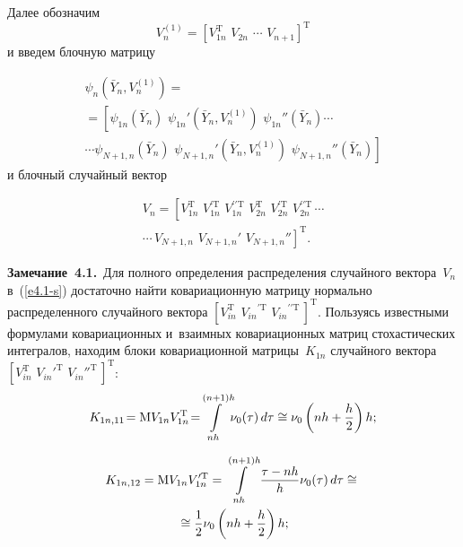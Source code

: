 \begin{multicols}{2}
Далее обозначим
$$
V_n^{(1)}=\left[ V_{1n}^{\mathrm{T}}\,\, V_{2n}\,\,\cdots\,\, V_{n+1}\right]^{\mathrm{T}}
$$
и введем блочную матрицу

\vspace*{-6pt}

\noindent
   \begin{multline*}
   \psi_n\left(\bar Y_n,V_n^{(1)}\right)={}\\
   {}=\left[\psi_{1n}(\bar Y_n)\,\,
    \psi_{1n}'\left(\bar Y_n,V_n^{(1)}\right)\,\, \psi_{1n}''(\bar Y_n) \cdots\right.\\
\left.\cdots     \psi_{N+1,n}\left(\bar Y_n\right)\,\, \psi_{N+1,n}'\left(\bar Y_n,V_n^{(1)}\right)\,\,
    \psi_{N+1,n}''\left(\bar Y_n\right) \right]
    \end{multline*}
и блочный случайный вектор

\vspace*{-6pt}

\noindent
\begin{multline*}
V_n=\left [ V_{1n}^{\mathrm{T}}\,\, V_{1n}^{\prime\mathrm{T}}\,\, V_{1n}^{\prime\prime\mathrm{T}}\,\,
    V_{2n}^{\mathrm{T}}\,\, V_{2n}^{\prime\mathrm{T}}\,\, V_{2n}^{\prime\prime\mathrm{T}}\,
    \cdots\right.\\
\left.    \cdots\, V_{N+1,n}\,\, V_{N+1,n}'\,\, V_{N+1,n}'' \right]^{\mathrm{T}}. %
    \end{multline*}

\noindent
\textbf{Замечание~4.1.}\
Для полного определения распределения случайного вектора~$V_n$ в~(\ref{e4.1-s}) достаточно найти ковариационную матрицу нормально
распределенного случайного вектора $[V_{{in}}^{\mathrm{T}}\,\,{V_{{in}}}^{\prime\mathrm{T}}\,\,{V_{{in}}}^{\prime\prime\mathrm{T}}\,]^{\mathrm{T}}$. 
Пользуясь известными
формулами ковариационных и~взаимных ковариационных матриц
стохастических интегралов, находим блоки ковариационной
матрицы~$K_{1n}$ случайного вектора $[V_{{in}}^{\mathrm{T}}\,\,{V_{{in}}'}^{\mathrm{T}}\,\,{V_{{in}}''}^{\mathrm{T}}\,]^{\mathrm{T}}$:
    $$
    K_{1n,11}\!=\mathrm{M} V_{1n}V_{1n}^{\mathrm{T}}\!=\!\!\int\limits_{nh}^{(n+1)h} \!\!\nu_0(\tau)\,d\tau\cong \nu_0\left(nh+\displaystyle\frac{\displaystyle h\mathstrut}{\displaystyle 2\mathstrut}\right)h;
    $$
    
\noindent
\begin{multline*}
    K_{1n,12}=\mathrm{M} V_{1n} V^{\prime\mathrm{T}}_{1n}=\int\limits_{nh}^{(n+1)h} {\displaystyle\frac{\displaystyle \tau-nh\mathstrut}{\displaystyle h\mathstrut}} \nu_0(\tau)\,d\tau
    \cong{}\\
    {}\cong \displaystyle\frac{\displaystyle 1\mathstrut}{\displaystyle 2\mathstrut}\nu_0\left(nh+\displaystyle\frac{\displaystyle h\mathstrut}{\displaystyle 2\mathstrut}\right)h;
 \end{multline*}
 

\end{multicols}
